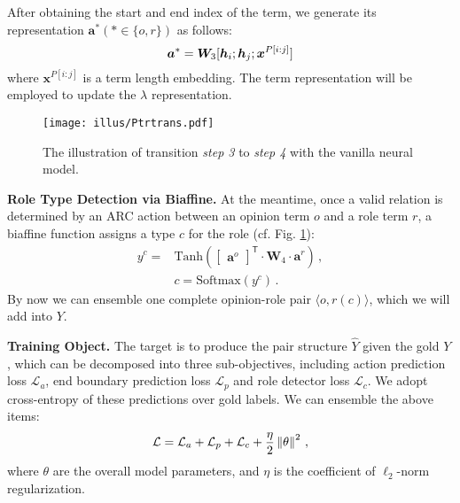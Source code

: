 \documentclass[letterpaper]{article} \usepackage{aaai22}  \usepackage{times}  \usepackage{helvet}  \usepackage{courier}  \usepackage[hyphens]{url}  \usepackage{graphicx} \urlstyle{rm} \def\UrlFont{\rm}  \usepackage{natbib}  \usepackage{caption} \DeclareCaptionStyle{ruled}{labelfont=normalfont,labelsep=colon,strut=off} \frenchspacing  \setlength{\pdfpagewidth}{8.5in}  \setlength{\pdfpageheight}{11in}  \usepackage{algorithm}
\begin{document}
After obtaining the start and end index of the term, we generate its representation $\bm{a}^{*}(* \in \{o, r\})$ as follows:
\begin{equation}
\setlength\abovedisplayskip{2pt}
\setlength\belowdisplayskip{2pt}
\bm{a}^{*} = \bm{W}_3[\bm{h}_i; \bm{h}_{j}; \bm{x}^{P[i:j]}] 
\label{span-representaion}
\end{equation}
where $\bm{x}^{P[i:j]}$ is a term length embedding.
The term representation will be employed to update the $\lambda$ representation.



\begin{figure}[!t]
\centering
\texttt{[image: illus/Ptrtrans.pdf]}
\caption{
The illustration of transition \emph{step 3} to \emph{step 4} with the vanilla neural model.
}
\label{TPtr1}
\end{figure}







\noindent\textbf{Role Type Detection via Biaffine.}
At the meantime, once a valid relation is determined by an ARC action between an opinion term $o$ and a role term $r$, a biaffine function \cite{BiaffineDozatM17} assigns a type $c$ for the role (cf. Fig. \ref{TPtr1}):
\setlength\abovedisplayskip{2pt}
\setlength\belowdisplayskip{2pt}
\begin{align}
\label{biaffine} y^c =& \text{Tanh}(\left[
\begin{array}{c}
  \bm{a}^o 
\end{array}
\right]^\mathsf{T}
\cdot \bm{W}_4 \cdot \bm{a}^{r}) \,, \\
&c = \text{Softmax}(y^c) \,.
\end{align}
By now we can ensemble one complete opinion-role pair $\langle o,r(c)\rangle$, which we will add into $Y$.









\noindent\textbf{Training Object.}
The target is to produce the pair structure $\hat{Y}$ given the gold $Y$, which can be decomposed into three sub-objectives, including action prediction loss $\mathcal{L}_a$, end boundary prediction loss $\mathcal{L}_p$ and role detector loss  $\mathcal{L}_c$.
We adopt cross-entropy of these predictions over gold labels.
We can ensemble the above items:
\begin{equation}
\setlength\abovedisplayskip{3pt}
\setlength\belowdisplayskip{3pt}
\mathcal{L} = \mathcal{L}_{a} + \mathcal{L}_p + \mathcal{L}_c + \frac{ \eta}{2} \left \| \theta \right\|^2 \,,
\end{equation}
where 
$\theta$ are the overall model parameters, and $\eta$ is the coefficient of $\ell_2$-norm regularization.
\end{document}
